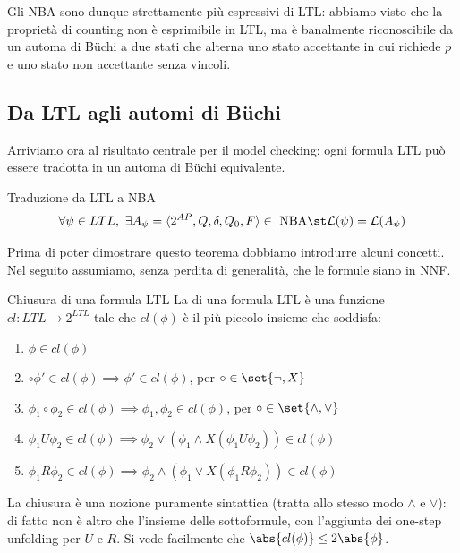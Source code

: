 \begin{note}{}
  Gli NBA sono dunque strettamente più espressivi di LTL: abbiamo visto che la proprietà di counting  non è esprimibile in LTL, ma è banalmente riconoscibile da un automa di Büchi a due stati che alterna uno stato accettante in cui richiede \(p\) e uno stato non accettante senza vincoli.
\end{note}

\subsection{Da LTL agli automi di Büchi}

Arriviamo ora al risultato centrale per il model checking: ogni formula LTL può essere tradotta in un automa di Büchi equivalente.

\begin{theorem}[label={th:ltl-to-nba}]{Traduzione da LTL a NBA}
  \[\forall \psi \in LTL,\ \exists A_\psi = \langle 2^{AP}, Q, \delta,Q_0,F\rangle \in\text{ NBA} \st \mathcal{L}(\psi) = \mathcal{L}(A_\psi)\]
\end{theorem}

Prima di poter dimostrare questo teorema dobbiamo introdurre alcuni concetti. Nel seguito assumiamo, senza perdita di generalità, che le formule siano in NNF\@.

\begin{definition}{Chiusura di una formula LTL}
  La di una formula LTL è una funzione \(cl:LTL\to 2^{LTL}\) tale che \(cl(\phi)\) è il più piccolo insieme che soddisfa:
  \begin{enumerate}
    \item \(\phi \in cl(\phi)\)
    \item \(\circ\phi'\in cl(\phi)\implies \phi'\in cl(\phi)\), per \(\circ \in \set{\neg,X}\)
    \item \(\phi_1 \circ \phi_2 \in cl(\phi) \implies \phi_1, \phi_2 \in cl(\phi)\), per \(\circ \in \set{\land,\lor}\)
    \item \(\phi_1 U \phi_2 \in cl(\phi) \implies \phi_2 \lor (\phi_1 \land X(\phi_1 U \phi_2)) \in cl(\phi)\)
    \item \(\phi_1 R \phi_2 \in cl(\phi) \implies \phi_2 \land (\phi_1 \lor X(\phi_1 R \phi_2)) \in cl(\phi)\)
  \end{enumerate}
\end{definition}

La chiusura è una nozione puramente sintattica (tratta allo stesso modo \(\land\) e \(\lor\)): di fatto non è altro che l'insieme delle sottoformule, con l'aggiunta dei one-step unfolding per \(U\) e \(R\). Si vede facilmente che \(\abs{cl(\phi)} \leq 2\abs{\phi}\).



